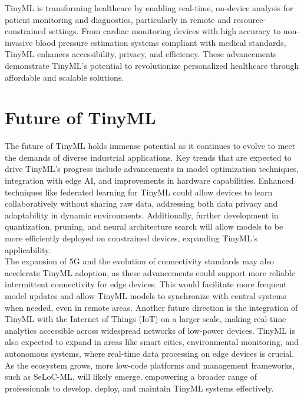 \documentclass[twocolumn]{article}
\begin{document}
TinyML is transforming healthcare by enabling real-time, on-device analysis for patient monitoring and diagnostics, particularly in remote and resource-constrained settings. From cardiac monitoring devices with high accuracy to non-invasive blood pressure estimation systems compliant with medical standards, TinyML enhances accessibility, privacy, and efficiency. These advancements demonstrate TinyML’s potential to revolutionize personalized healthcare through affordable and scalable solutions.


\section{Future of TinyML}
\label{future_of_tinyml}

The future of TinyML holds immense potential as it continues to evolve to meet the demands of diverse industrial applications. Key trends that are expected to drive TinyML's progress include advancements in model optimization techniques, integration with edge AI, and improvements in hardware capabilities. Enhanced techniques like federated learning for TinyML could allow devices to learn collaboratively without sharing raw data, addressing both data privacy and adaptability in dynamic environments. Additionally, further development in quantization, pruning, and neural architecture search will allow models to be more efficiently deployed on constrained devices, expanding TinyML’s applicability.\\[0.1cm]

The expansion of 5G and the evolution of connectivity standards may also accelerate TinyML adoption, as these advancements could support more reliable intermittent connectivity for edge devices. This would facilitate more frequent model updates and allow TinyML models to synchronize with central systems when needed, even in remote areas. Another future direction is the integration of TinyML with the Internet of Things (IoT) on a larger scale, making real-time analytics accessible across widespread networks of low-power devices. TinyML is also expected to expand in areas like smart cities, environmental monitoring, and autonomous systems, where real-time data processing on edge devices is crucial. As the ecosystem grows, more low-code platforms and management frameworks, such as SeLoC-ML, will likely emerge, empowering a broader range of professionals to develop, deploy, and maintain TinyML systems effectively.\\[0.1cm]
\end{document}
